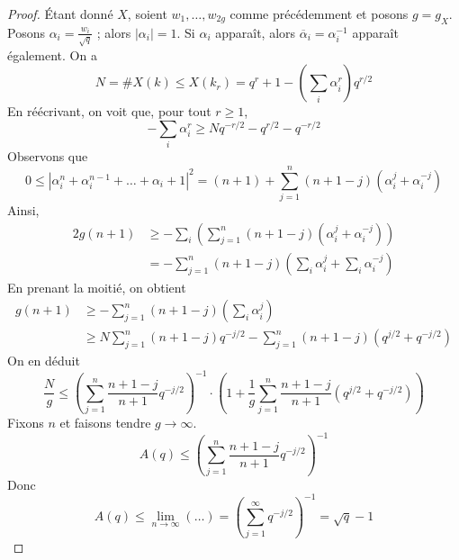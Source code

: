 \begin{proof}
Étant donné $X$, soient $w_1, \ldots, w_{2g}$ comme précédemment et posons $g = g_X$.
Posons $\alpha_i = \frac{w_i}{\sqrt{q}}$ ; alors $|\alpha_i| = 1$. Si $\alpha_i$
apparaît, alors $\overline{\alpha}_i = \alpha_i^{-1}$ apparaît également. On a
$$
N = \# X(k) \leq X(k_r) = q^r + 1 - (\sum_i \alpha_i^r) q^{r/2}
$$
En réécrivant, on voit que, pour tout $r \geq 1$,
$$
-\sum_i \alpha_i^r \geq Nq^{-r/2} - q^{r/2} - q^{-r/2}
$$
Observons que
$$
0 \leq |\alpha_i^n +\alpha_i^{n-1} +\ldots +\alpha_i +1|^2
= (n + 1) + \sum_{j = 1}^n (n + 1 - j) (\alpha_i^j + \alpha_i^{-j})
$$
Ainsi,
\begin{align*}
2g(n+1) & \geq - \sum_i \left(\sum_{j = 1}^n (n+1-j)(\alpha_i^j
+\alpha_i^{-j})\right)\\
& =-\sum_{j = 1}^n (n+1-j)\left(\sum_i\alpha_i^j
+\sum_i\alpha_i^{-j}\right)
\end{align*}
En prenant la moitié, on obtient
\begin{align*}
g(n+1)& \geq - \sum_{j = 1}^n (n+1-j)(\sum_i\alpha_i^j)\\
& \geq N\sum_{j = 1}^n (n+1-j)q^{-j/2}-\sum_{j = 1}^n
(n+1-j)(q^{j/2}+q^{-j/2})
\end{align*}
On en déduit
$$
\frac{N}{g}\leq \left(\sum_{j = 1}^n \frac{n+1-j}{n+1}q^{-j/2} \right)^{-1}
\cdot
\left(
1 + \frac{1}{g} \sum_{j = 1}^n \frac{n + 1 - j}{n + 1}(q^{j/2} + q^{-j/2})
\right)
$$
Fixons $n$ et faisons tendre $g\to \infty$.
$$
A(q)\leq \left(\sum_{j = 1}^n \frac{n+1-j}{n+1}q^{-j/2}\right)^{-1}
$$
Donc
$$
A(q)\leq \lim_{n\to\infty}(\ldots) = \left(\sum_{j = 1}^\infty
q^{-j/2}\right)^{-1}=\sqrt{q}-1
$$
\end{proof}











